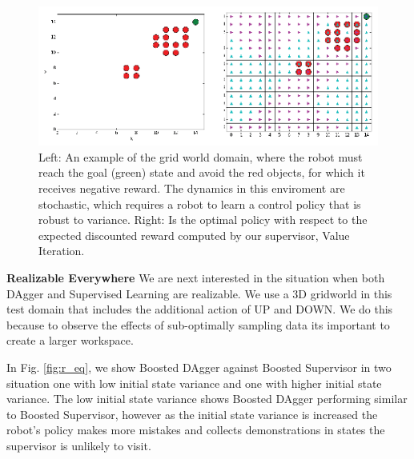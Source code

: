 \documentclass[10pt, conference]{ieeeconf}      %
\begin{document}
\begin{figure}
\centering
\includegraphics{f_figs/grid_world.eps}
\caption{
    \footnotesize
Left: An example of the grid world domain, where the robot must reach the goal (green) state and avoid the red objects, for which it receives negative reward. The dynamics in this enviroment are stochastic, which requires a robot to learn a control policy that is robust to variance. Right: Is the optimal policy with respect to the expected discounted reward computed by our supervisor, Value Iteration.  }
\vspace*{-10pt}
\label{fig:grid_world}
\end{figure}

\noindent \textbf{Realizable Everywhere} 
We are next interested in the situation when both DAgger and Supervised Learning are realizable. We use a 3D gridworld in this test domain that includes the additional action of UP and DOWN. We do this because to observe the effects of sub-optimally sampling data its important to create a larger workspace. 

In Fig. \ref{fig:r_eq}, we show Boosted DAgger against Boosted Supervisor in two situation one with low initial state variance and one with higher initial state variance. The low initial state variance shows Boosted DAgger performing similar to Boosted Supervisor, however as the initial state variance is increased the robot's policy makes more mistakes and collects demonstrations in states the supervisor is unlikely to visit. 
\end{document}
